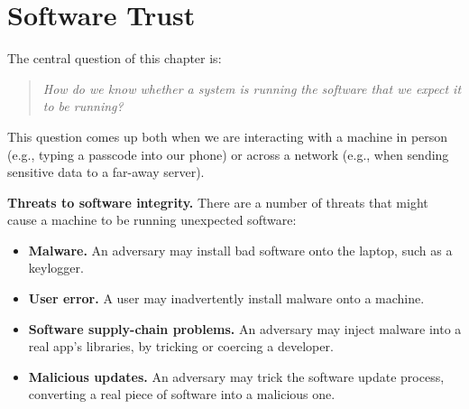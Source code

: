 \documentclass[
  letterpaper,
]{scrbook}
\providecommand{\tightlist}{%
  \setlength{\itemsep}{0pt}\setlength{\parskip}{0pt}}
\theoremstyle{definition}
\theoremstyle{plain}
\theoremstyle{plain}
\theoremstyle{remark}
\begin{document}
\chapter{Software Trust}\label{software-trust}

The central question of this chapter is:

\begin{quote}
\emph{How do we know whether a system is running the software that we
expect it to be running?}
\end{quote}

This question comes up both when we are interacting with a machine in
person (e.g., typing a passcode into our phone) or across a network
(e.g., when sending sensitive data to a far-away server).


\textbf{Threats to software integrity.} There are a number of threats
that might cause a machine to be running unexpected software:

\begin{itemize}
\tightlist
\item
  \textbf{Malware.} An adversary may install bad software onto the
  laptop, such as a keylogger.
\item
  \textbf{User error.} A user may inadvertently install malware onto a
  machine.
\item
  \textbf{Software supply-chain problems.} An adversary may inject
  malware into a real app's libraries, by tricking or coercing a
  developer.
\item
  \textbf{Malicious updates.} An adversary may trick the software update
  process, converting a real piece of software into a malicious one.
\end{itemize}

\end{document}
